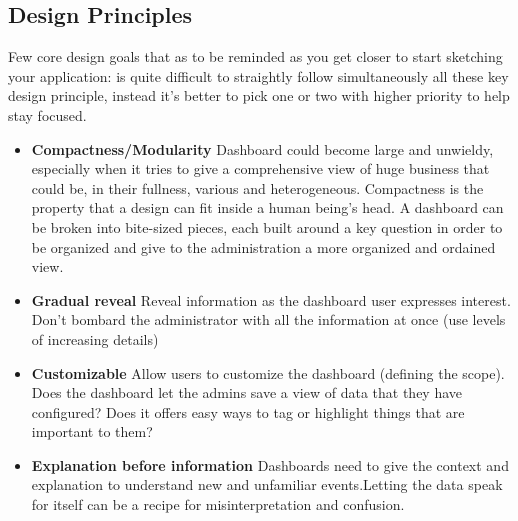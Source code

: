 \documentclass[a4paper,13pt]{report}
\begin{document}
\subsection{Design Principles}
Few core design goals that as to be reminded as you get closer to start sketching your application: is quite difficult to straightly follow simultaneously all these key design principle, instead it's better to pick one or two with higher priority to help stay focused.
\begin{itemize}
    \item \textbf{Compactness/Modularity}\newline
    Dashboard could become large and unwieldy, especially when it tries to give a comprehensive view of huge business that could be, in their fullness, various and heterogeneous. Compactness is the property that a design can fit inside a human being's head.
    A dashboard can be broken into bite-sized pieces, each built around a key question in order to be organized and give to the administration a more organized and ordained view.
    \item \textbf{Gradual reveal}\newline
    Reveal information as the dashboard user expresses interest. Don't bombard the administrator with all the information at once (use levels of increasing details)
    \item \textbf{Customizable}\newline   
    Allow users to customize the dashboard (defining the scope). 
    Does the dashboard let the admins save a view of data that they have configured? \newline
    Does it offers easy ways to tag or highlight things that are important to them?
    \item \textbf{Explanation before information}\newline
    Dashboards need to give the context and explanation to understand new and unfamiliar events.Letting the data speak for itself can be a recipe for misinterpretation and confusion.
\end{itemize}
\end{document}
